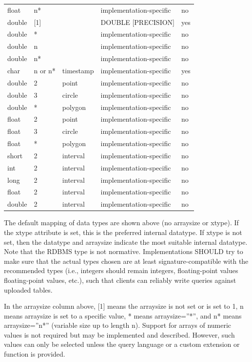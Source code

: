 \documentclass[11pt,letter]{ivoa}
\begin{document}
\begin{tabular}{l l l l l}
float & n* & & implementation-specific & no \\
double & [1] & & DOUBLE [PRECISION] & yes \\
double & * & & implementation-specific & no \\
double & n & & implementation-specific & no \\
double & n* & & implementation-specific & no \\
char & n or n* & timestamp & implementation-specific & yes \\
double & 2 & point & implementation-specific & no \\
double & 3 & circle & implementation-specific & no \\
double & * & polygon & implementation-specific & no \\
float & 2 & point & implementation-specific & no \\
float & 3 & circle & implementation-specific & no \\
float & * & polygon & implementation-specific & no \\
short & 2 & interval & implementation-specific & no \\
int & 2 & interval & implementation-specific & no \\
long & 2 & interval & implementation-specific & no \\
float & 2 & interval & implementation-specific & no \\
double & 2 & interval & implementation-specific & no \\
\end{tabular}

The default mapping of data types are shown above (no arraysize or xtype). If 
the xtype attribute is set, this is the preferred internal datatype. If xtype is 
not set, then the datatype and arraysize indicate the most suitable internal 
datatype. Note that the RDBMS type is not normative. 
Implementations SHOULD try to make sure that the actual types chosen are at 
least signature-compatible with the recommended types (i.e., integers should 
remain integers, floating-point values floating-point values, etc.), such that 
clients can reliably write queries against uploaded tables.

In the arraysize column above, [1] means the arraysize is not set or is set to 
1, n means arraysize is set to a specific value, * means arraysize=”*”, and n* 
means arraysize=”n*” (variable size up to length n). Support for arrays of 
numeric values is not required but may be implemented and described. However, such
values can only be selected unless the query language or a custom extension or function
is provided.
\end{document}
